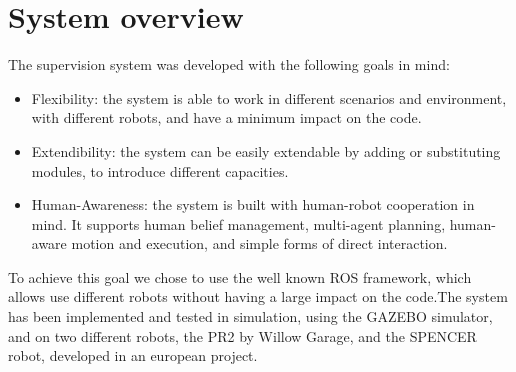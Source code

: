 \section{System overview}
The supervision system was developed with the following goals in mind:
\begin{itemize}
\item Flexibility: the system is able to work in different scenarios and environment, with different robots, and have a minimum impact on the code.  
\item Extendibility: the system can be easily extendable by adding or substituting modules, to introduce different capacities.
\item Human-Awareness: the system is built with human-robot cooperation in mind. It supports human belief management, multi-agent planning, human-aware motion and execution, and simple forms of direct interaction.
\end{itemize}

To achieve this goal we chose to use the well known ROS framework, which allows use different robots without having a large impact on the code.The system has been implemented and tested in simulation, using the GAZEBO simulator, and on two different robots, the PR2 by Willow Garage, and the SPENCER robot, developed in an european project. 

